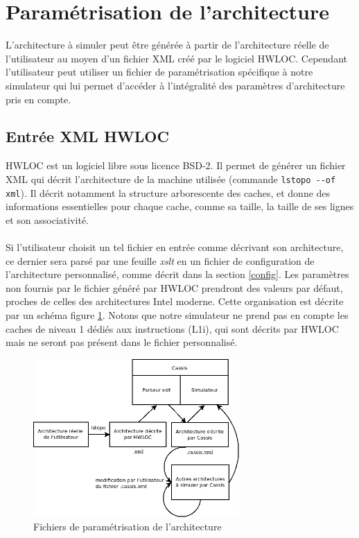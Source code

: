 \section{Paramétrisation de l'architecture}

\label{param_xml}
L'architecture à simuler peut être générée à partir de l'architecture réelle de l'utilisateur au moyen d'un fichier XML créé par le logiciel \textsf{HWLOC}. Cependant l'utilisateur peut utiliser un fichier de paramétrisation spécifique à notre simulateur qui lui permet d'accéder à l'intégralité des paramètres d'architecture pris en compte.

\subsection{Entrée XML HWLOC}

\textsf{HWLOC} est un logiciel libre sous licence BSD-2. Il permet de générer un fichier XML qui décrit l'architecture de la machine utilisée (commande \verb?lstopo --of xml?). Il décrit notamment la structure arborescente des caches, et donne des informations essentielles pour chaque cache, comme sa taille, la taille de ses lignes et son associativité. 

\paragraph{}
Si l'utilisateur choisit un tel fichier en entrée comme décrivant son architecture, ce dernier sera parsé par une feuille \textit{xslt} en un fichier de configuration de l'architecture personnalisé, comme décrit dans la section \ref{config}. Les paramètres non fournis par le fichier généré par \textsf{HWLOC} prendront des valeurs par défaut, proches de celles des architectures \textsf{Intel} moderne. Cette organisation est décrite par un schéma figure \ref{img:archi}. Notons que notre simulateur ne prend pas en compte les caches de niveau 1 dédiés aux instructions (L1i), qui sont décrits par \textsf{HWLOC} mais ne seront pas présent dans le fichier personnalisé.

\begin{figure}[!h]
\begin{center}
   \includegraphics[width=0.7\textwidth]{images/schema_archi.png}
   \caption{\label{img:archi} Fichiers de paramétrisation de l'architecture}
\end{center}
\end{figure}

